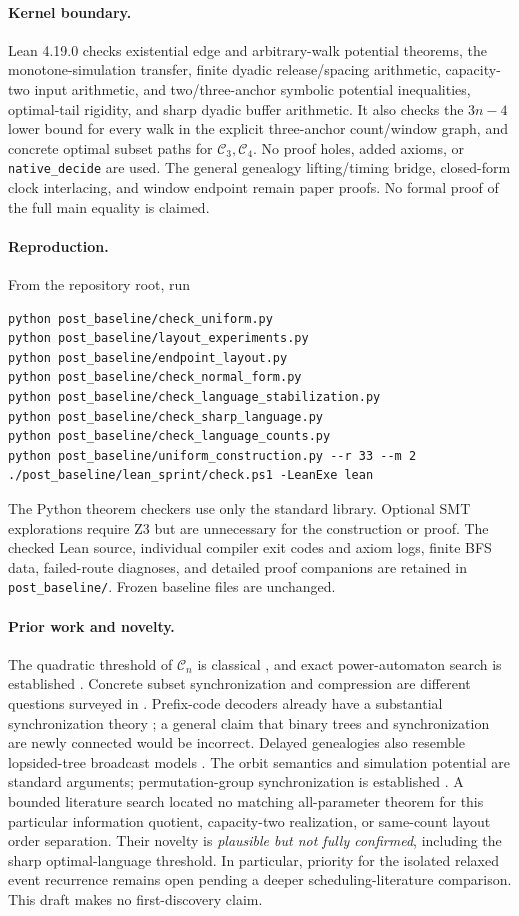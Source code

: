 \documentclass[11pt]{article}
\newcommand{\C}{\mathcal C}
\begin{document}
\paragraph{Kernel boundary.}
Lean 4.19.0 checks existential edge and arbitrary-walk potential theorems,
the monotone-simulation transfer, finite dyadic release/spacing arithmetic,
capacity-two input arithmetic, and two/three-anchor symbolic potential
inequalities, optimal-tail rigidity, and sharp dyadic buffer arithmetic.
It also checks the $3n-4$ lower bound for every walk in the
explicit three-anchor count/window graph, and concrete optimal subset
paths for $\C_3,\C_4$. No proof holes, added axioms, or
\texttt{native\_decide} are used. The general genealogy lifting/timing
bridge, closed-form clock interlacing, and window endpoint remain paper
proofs. No formal proof of the full main equality is claimed.

\paragraph{Reproduction.}
From the repository root, run
\begin{verbatim}
python post_baseline/check_uniform.py
python post_baseline/layout_experiments.py
python post_baseline/endpoint_layout.py
python post_baseline/check_normal_form.py
python post_baseline/check_language_stabilization.py
python post_baseline/check_sharp_language.py
python post_baseline/check_language_counts.py
python post_baseline/uniform_construction.py --r 33 --m 2
./post_baseline/lean_sprint/check.ps1 -LeanExe lean
\end{verbatim}
The Python theorem checkers use only the standard library. Optional SMT
explorations require Z3 but are unnecessary for the construction or proof.
The checked Lean source, individual compiler exit codes and axiom logs,
finite BFS data, failed-route diagnoses, and detailed proof companions are
retained in \texttt{post\_baseline/}. Frozen baseline files are unchanged.

\paragraph{Prior work and novelty.}
The quadratic threshold of $\C_n$ is classical \cite{volkov}, and exact
power-automaton search is established \cite{search}. Concrete subset
synchronization and compression are different questions surveyed in
\cite{openproblems}. Prefix-code decoders already have a substantial
synchronization theory \cite{huffman}; a general claim that binary trees
and synchronization are newly connected would be incorrect. Delayed
genealogies also resemble lopsided-tree broadcast models \cite{lopsided}.
The orbit semantics and simulation potential are standard arguments;
permutation-group synchronization is established \cite{groups}.
A bounded literature search located no matching all-parameter theorem for
this particular information quotient, capacity-two realization, or
same-count layout order separation. Their novelty is \emph{plausible but
not fully confirmed}, including the sharp optimal-language threshold.
In particular, priority for the isolated relaxed
event recurrence remains open pending a deeper scheduling-literature
comparison. This draft makes no first-discovery claim.
\end{document}
